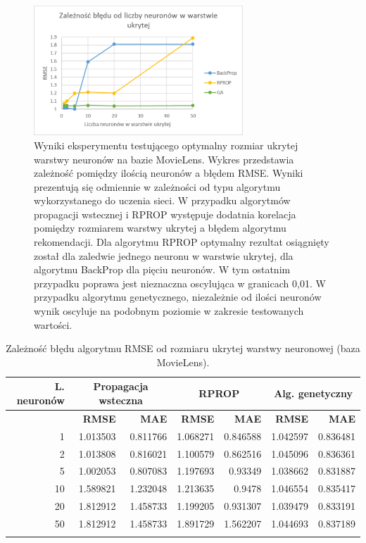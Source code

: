 \documentclass[twoside]{iisthesis}
\begin{document}
			\begin{figure}[H]
				\centering
				\includegraphics[width=0.7\textwidth]{exphiddenneural}
				\caption{Wyniki eksperymentu testującego optymalny rozmiar ukrytej warstwy neuronów na bazie MovieLens. Wykres przedstawia zależność pomiędzy ilością neuronów a błędem RMSE. Wyniki prezentują się odmiennie w zależności od typu algorytmu wykorzystanego do uczenia sieci. W przypadku algorytmów propagacji wstecznej i RPROP występuje dodatnia korelacja pomiędzy rozmiarem warstwy ukrytej a błędem algorytmu rekomendacji. Dla algorytmu RPROP optymalny rezultat osiągnięty został dla zaledwie jednego neuronu w warstwie ukrytej, dla algorytmu BackProp dla pięciu neuronów. W tym ostatnim przypadku poprawa jest nieznaczna oscylująca w granicach 0,01. W przypadku algorytmu genetycznego, niezależnie od ilości neuronów wynik oscyluje na podobnym poziomie w zakresie testowanych wartości.}
				\label{fig:exphiddenneural}
			\end{figure}
			
			\begin{longtable}{r||rr|rr|rr}
				\label{tab:exphiddenneural}
				\centering
				\textbf{L. neuronów} &  \multicolumn{2}{c|}{\textbf{Propagacja wsteczna}}  & \multicolumn{2}{c|}{\textbf{RPROP}} & \multicolumn{2}{c}{\textbf{Alg. genetyczny}}  \\
				\hline
				& \textbf{RMSE} & \textbf{MAE} & \textbf{RMSE} & \textbf{MAE} & \textbf{RMSE} & \textbf{MAE} \\
				\hline
				1                                   & 1.013503                          & 0.811766 & 1.068271 & 0.846588 & 1.042597 & 0.836481 \\
				2                                   & 1.013808                          & 0.816021 & 1.100579 & 0.862516 & 1.045096 & 0.836361 \\
				5                                   & 1.002053                          & 0.807083 & 1.197693 & 0.93349  & 1.038662 & 0.831887 \\
				10                                  & 1.589821                          & 1.232048 & 1.213635 & 0.9478   & 1.046554 & 0.835417 \\
				20                                  & 1.812912                          & 1.458733 & 1.199205 & 0.931307 & 1.039479 & 0.833191 \\
				50                                  & 1.812912                          & 1.458733 & 1.891729 & 1.562207 & 1.044693 & 0.837189\\		
				\caption{Zależność błędu algorytmu RMSE od rozmiaru ukrytej warstwy neuronowej (baza MovieLens).}
			\end{longtable}
		
\end{document}
